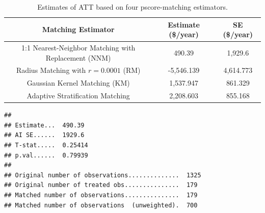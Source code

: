 \documentclass[
]{article}
\newenvironment{Shaded}{\begin{snugshade}}{\end{snugshade}}
\newcommand{\AttributeTok}[1]{\textcolor[rgb]{0.13,0.29,0.53}{#1}}
\newcommand{\DecValTok}[1]{\textcolor[rgb]{0.00,0.00,0.81}{#1}}
\newcommand{\FunctionTok}[1]{\textcolor[rgb]{0.13,0.29,0.53}{\textbf{#1}}}
\newcommand{\NormalTok}[1]{#1}
\newcommand{\OtherTok}[1]{\textcolor[rgb]{0.56,0.35,0.01}{#1}}
\newcommand{\SpecialCharTok}[1]{\textcolor[rgb]{0.81,0.36,0.00}{\textbf{#1}}}
\newcommand{\StringTok}[1]{\textcolor[rgb]{0.31,0.60,0.02}{#1}}
\begin{document}
\begin{table}[h]
\centering
\begin{tabular}{ccc}
\hline \hline
\textbf{Matching Estimator} & \textbf{Estimate (\$/year)} & \textbf{SE (\$/year)} \\ \hline
1:1 Nearest-Neighbor Matching with Replacement (NNM)       &  490.39 & 1,929.6  \\
Radius Matching with $r=0.0001$ (RM)  &  -5,546.139 &  4,614.773 \\
Gaussian Kernel Matching (KM)        &  1,537.947 & 861.329  \\ 
Adaptive Stratification Matching     &  2,208.603 &  855.168 \\ \hline
\end{tabular}
\caption{Estimates of ATT based on four pscore-matching estimators.}
\label{tab:Tab25-4_2}
\end{table}

\begin{Shaded}
\end{Shaded}

\begin{verbatim}
## 
## Estimate...  490.39 
## AI SE......  1929.6 
## T-stat.....  0.25414 
## p.val......  0.79939 
## 
## Original number of observations..............  1325 
## Original number of treated obs...............  179 
## Matched number of observations...............  179 
## Matched number of observations  (unweighted).  700
\end{verbatim}
\end{document}
